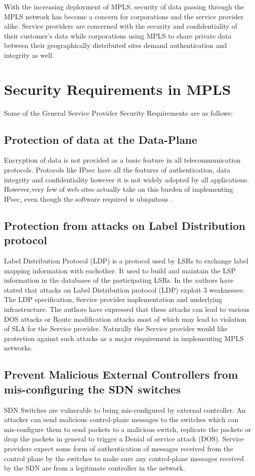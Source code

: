 With the increasing deployment of MPLS, security of data passing through the MPLS network has become a concern for corporations and the service provider alike. Service providers are concerned with the security and confidentiality of their customer’s data while corporations using MPLS to share private data between their geographically distributed sites demand authentication and integrity as well.


\section{Security Requirements in MPLS}
Some of the General Service Provider Security Requirements are as follows:

\subsection*{Protection of data at the Data-Plane}
Encryption of data is not provided as a basic feature in all telecommunication protocols. Protocols like IPsec have all the features of authentication, data integrity and confidentiality however it is not widely adopted by all applications. However,very few of web sites actually take on this burden of implementing IPsec, even though the software required is ubiquitous \cite{mpls-os-internet-draft}.

\subsection*{Protection from attacks on Label Distribution protocol}
Label Distribution Protocol (LDP) is a protocol used by LSRs to exchange label mapping information with eachother. It used to build and maintain the LSP information in the databases of the participating LSRs. In \cite{grayson2009analysis} the authors have stated that attacks on Label Distribution protocol (LDP) exploit 3 weaknesses: The LDP specification, Service provider implementation and underlying infrastructure. The authors have expressed that these attacks can lead to various DOS attacks or Route modification attacks most of which may lead to violation of SLA for the Service provider. Naturally the Service provider would like protection against such attacks as a major requirement in implementing MPLS networks.

\subsection*{Prevent Malicious External Controllers from mis-configuring the SDN switches}
SDN Switches are vulnerable to being mis-configured by external controller. An attacker can send malicious control-plane messages to the switches which can mis-configure them to send packets to a malicious switch, replicate the packets or drop the packets in general to trigger a Denial of service attack (DOS). Service providers expect some form of authentication of messages received from the control plane by the switches to make sure any control-plane messages received by the SDN are from a legitimate controller in the network.

